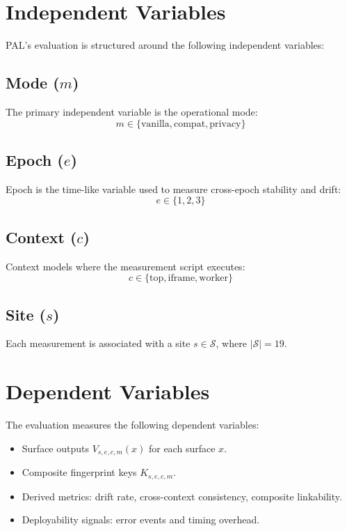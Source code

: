 \documentclass[11pt]{report}
\begin{document}
\section{Independent Variables}

PAL’s evaluation is structured around the following independent variables:

\subsection{Mode ($m$)}

The primary independent variable is the operational mode:
\[
m \in \{\text{vanilla},\text{compat},\text{privacy}\}
\]

\subsection{Epoch ($e$)}

Epoch is the time-like variable used to measure cross-epoch stability and drift:
\[
e \in \{1,2,3\}
\]

\subsection{Context ($c$)}

Context models where the measurement script executes:
\[
c \in \{\text{top},\text{iframe},\text{worker}\}
\]

\subsection{Site ($s$)}

Each measurement is associated with a site $s \in \mathcal{S}$, where $|\mathcal{S}| = 19$.

\section{Dependent Variables}

The evaluation measures the following dependent variables:

\begin{itemize}
    \item Surface outputs $V_{s,e,c,m}(x)$ for each surface $x$.
    \item Composite fingerprint keys $K_{s,e,c,m}$.
    \item Derived metrics: drift rate, cross-context consistency, composite linkability.
    \item Deployability signals: error events and timing overhead.
\end{itemize}
\end{document}
